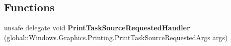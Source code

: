 \subsection*{Functions}
\begin{DoxyCompactItemize}
\item 
\mbox{\label{namespace_windows_1_1_graphics_1_1_printing_a4e5ef8748b4ac07ad14d46db2dee1d28}} 
unsafe delegate void {\bfseries Print\+Task\+Source\+Requested\+Handler} (global\+::\+Windows.\+Graphics.\+Printing.\+Print\+Task\+Source\+Requested\+Args args)
\end{DoxyCompactItemize}
